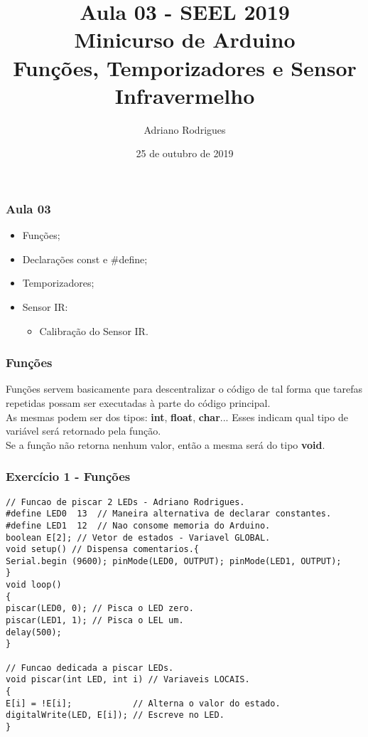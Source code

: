 \documentclass{beamer}
\title[Funções, Temporizadores e Sensor IR]{Aula 03 - SEEL 2019 \\Minicurso de Arduino \\Funções, Temporizadores e Sensor Infravermelho}
\author[Adriano]{Adriano Rodrigues}
\date{25 de outubro de 2019}
\begin{document}
\begin{frame}
	\titlepage
\end{frame}

\begin{frame}
\frametitle{Aula 03}
	\begin{itemize}
		\item Funções;
		\item Declarações const e  \#define;
		\item Temporizadores;
		\item Sensor IR:
		\begin{itemize}
		\item Calibraç\~ao do Sensor IR.
		\end{itemize}
	\end{itemize}
\end{frame}

\begin{frame}
	\frametitle{Funç\~oes}
	Funç\~oes servem basicamente para descentralizar o c\'odigo de tal forma que tarefas repetidas possam ser executadas \`a parte do c\'odigo principal.\\[5pt]
	As mesmas podem ser dos tipos: \textbf{int}, \textbf{float}, \textbf{char}... Esses indicam qual tipo de vari\'avel ser\'a retornado pela funç\~ao.\\[5pt]
	Se a função não retorna nenhum valor, então a mesma será do tipo \textbf{void}.
\end{frame}

\begin{frame}[fragile]
	\frametitle{Exercício 1 - Funções}
	\begin{lstlisting}[style=Arduino,basicstyle=\scriptsize \ttfamily]
// Funcao de piscar 2 LEDs - Adriano Rodrigues.
#define LED0  13  // Maneira alternativa de declarar constantes.
#define LED1  12  // Nao consome memoria do Arduino.
boolean E[2]; // Vetor de estados - Variavel GLOBAL.
void setup() // Dispensa comentarios.{
Serial.begin (9600); pinMode(LED0, OUTPUT); pinMode(LED1, OUTPUT);
}
void loop()
{
piscar(LED0, 0); // Pisca o LED zero.
piscar(LED1, 1); // Pisca o LEL um.
delay(500);
}

// Funcao dedicada a piscar LEDs.
void piscar(int LED, int i) // Variaveis LOCAIS.
{
E[i] = !E[i];            // Alterna o valor do estado.
digitalWrite(LED, E[i]); // Escreve no LED.
}
\end{lstlisting}
\end{frame}
\end{document}
